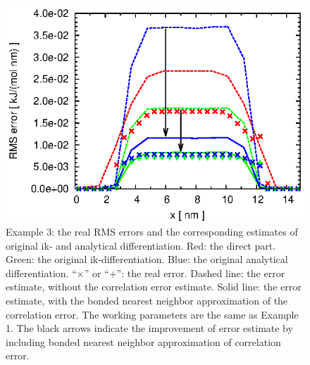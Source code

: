 \documentclass[aps,pre,preprint,unsortedaddress]{revtex4}
\newcommand{\recheck}[1]{{\color{red} #1}}
\begin{document}
\begin{figure}
  \centering
  \includegraphics[]{fig.water.orig.error.eps}
  \caption{
    Example 3: the real RMS errors and the corresponding
    estimates of original ik- and analytical differentiation.
    Red: the direct part.
    Green: the original ik-differentiation.
    Blue: the original analytical differentiation.
    ``$\times$'' or ``+'': the real error.
    Dashed line: the error estimate, without the correlation error estimate.
    Solid  line: the error estimate, with the \recheck{bonded} nearest neighbor
    approximation of the correlation error.
    The working parameters are the same as Example 1.
    The black arrows indicate the improvement
    of error estimate by including \recheck{bonded} nearest neighbor
    approximation of correlation error.
  }   
  \label{fig:water-error0}
\end{figure}
\end{document}

